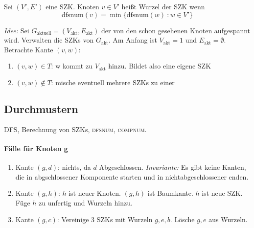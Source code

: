                     \begin{definition}
                        Sei $(V',E')$ eine SZK. Knoten $v \in V'$ heißt Wurzel der SZK wenn 
                        $$
                            \text{dfsnum}(v) = \min\{\text{dfsnum}(w)\ : w \in V'\}
                        $$
                    \end{definition}
                    \emph{Idee:} Sei $G_{\text{aktuell}} = (V_{\text{akt}}, E_{\text{akt}})$ der von den  schon gesehenen Knoten aufgespannt wird. Verwalten die SZKs von $G_{\text{akt}}$. Am Anfang ist $V_{\text{akt}} = 1$ und $E_{\text{akt}} = \emptyset$. Betrachte Kante $(v,w)$:
                    \begin{enumerate}
                        \item $(v,w) \in T$: w kommt zu $V_{\text{akt}}$ hinzu. Bildet also eine eigene SZK
                        \item $(v,w) \not \in T$: mische eventuell mehrere SZKs zu einer
                    \end{enumerate}


%
%
        \subsection{Durchmustern} DFS, Berechnung von SZKs, \textsc{dfsnum}, \textsc{compnum}.




        \paragraph{Fälle für Knoten g}
        \begin{enumerate}
            \item Kante $(g, d)$: nichts, da $d$ Abgeschlossen.
            \emph{Invariante:} Es gibt keine Kanten, die in abgschlossener Komponente starten und in nichtabgeschlossener enden.
            \item Kante $(g, h)$: $h$ ist neuer Knoten. $(g, h)$ ist Baumkante. $h$ ist neue SZK. Füge $h$ zu unfertig und Wurzeln hinzu.
            \item Kante $(g, c)$: Vereinige 3 SZKs mit Wurzeln $g, e, b$. Lösche $g, e$ aus Wurzeln.
        \end{enumerate}


